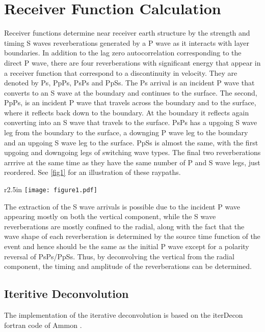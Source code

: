 \documentclass[titlepage]{article}
\begin{document}
\section{Receiver Function Calculation}

Receiver functions determine near receiver earth structure by the strength and timing S waves reverberations generated by a P wave as it interacts with layer boundaries. In addition to the lag zero autocorrelation corresponding to the direct P wave, there are four reverberations with significant energy that appear in a receiver function that correspond to a discontinuity in velocity. They are denoted by Ps, PpPs, PsPs and PpSs. The Ps arrival is an incident P wave that converts to an S wave at the boundary and continues to the surface. The second, PpPs, is an incident P wave that travels across the boundary and to the surface, where it reflects back down to the boundary. At the boundary it reflects again converting into an S wave that travels to the surface. PsPs has a upgoing S wave leg from the boundary to the surface, a downging P wave leg to the boundary and an upgoing S wave leg to the surface. PpSs is almost the same, with the first upgoing and downgoing legs of switching wave types. The final two reverberations arrrive at the same time as they have the same number of P and S wave legs, just reordered. See \ref{fig1} for an illustration of these raypaths.

\begin{wrapfigure}{r}{2.5in} 
\texttt{[image: figure1.pdf]} 
\caption{This is an inserted PDF graphic} 
\label{fig1} 
\end{wrapfigure}

The extraction of the S wave arrivals is possible due to the incident P wave appearing mostly on both the vertical component, while the S wave reverberations are mostly confined to the radial, along with the fact that the wave shape of each reverberation is determined by the source time function of the event and hence should be the same as the initial P wave except for a polarity reversal of PsPs/PpSs. Thus, by deconvolving the vertical from the radial component, the timing and amplitude of the reverberations can be determined. 


\subsection{Iteritive Deconvolution}

The implementation of the iterative deconvolution is based on the iterDecon fortran code of Ammon \cite{iterdecon}. 
\end{document}
